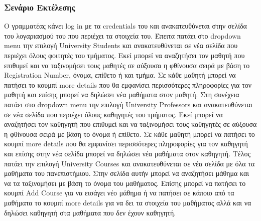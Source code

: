 \documentclass[12pt]{article}
\begin{document}
	
	\subsubsection{Σενάριο Εκτέλεσης}
	Ο γραμματέας κάνει log in με τα credentials του και ανακατευθύνεται στην σελίδα του λογαριασμού του που περιέχει τα στοιχεία του. Έπειτα πατάει στο dropdown menu την επιλογή University Students και ανακατευθύνεται σε νέα σελίδα που περιέχει όλους φοιτητές του τμήματος. Εκεί μπορεί να αναζητήσει τον μαθητή που επιθυμεί και να ταξινομήσει τους μαθητές σε αύξουσα η φθίνουσα σειρά με βάση το Registration Number, όνομα, επίθετο ή και τμήμα. Σε κάθε μαθητή μπορεί να πατήσει το κουμπί more details που θα εμφανίσει περισσότερες πληροφορίες  για τον μαθητή και επίσης μπορεί να δηλώσει νέα μαθήματα στον μαθητή. Στη συνέχεια πατάει στο dropdown menu την επιλογή University Professors και ανακατευθύνεται σε νέα σελίδα που περιέχει όλους καθηγητές του τμήματος. Εκεί μπορεί να αναζητήσει τον καθηγητή που επιθυμεί και να ταξινομήσει τους καθηγητές σε αύξουσα η φθίνουσα σειρά με βάση το  όνομα ή  επίθετο. Σε κάθε μαθητή μπορεί να πατήσει το κουμπί more details που θα εμφανίσει περισσότερες πληροφορίες  για τον καθηγητή και επίσης στην νέα σελίδα μπορεί να δηλώσει νέα μαθήματα στον καθηγητή. Τέλος πατάει την επιλογή University Courses και ανακατευθύνεται σε νέα σελίδα με όλα τα μαθήματα του πανεπιστήμιου. Στην σελίδα αυτήν μπορεί να αναζητήσει μάθημα και να τα ταξινομήσει με βάση το όνομα του μαθήματος. Επίσης μπορεί να πατήσει το κουμπί Add Course για να εισάγει νέο μάθημα ή να πατήσει σε κάποιο από τα μαθήματα το κουμπί more details για να δει τα στοιχεία του μαθήματος αλλά και να δηλώσει καθηγητή στα μαθήματα που δεν έχουν καθηγητή.
	
	
	
\end{document}
